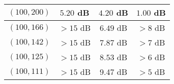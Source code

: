 \begin{table}[t]
\begin{tabular}{c|cc|c|}
    \multicolumn{1}{|c|}{$(100,200)$}  & \multicolumn{1}{c|}{$5.20$ dB}                                                   & $4.20$ dB                                                     & $1.00$ dB                                                                                                          \\ \hline
    \multicolumn{1}{|c|}{$(100,166)$}  & \multicolumn{1}{c|}{$>15$ dB}                                                         & $6.49$ dB                                                     & $>8$ dB                                                                                                                \\ \hline
    \multicolumn{1}{|c|}{$(100,142)$}  & \multicolumn{1}{c|}{$>15$ dB}                                                         & $7.87$ dB                                                     & $>7$ dB                                                                                                                \\ \hline
    \multicolumn{1}{|c|}{$(100,125)$}  & \multicolumn{1}{c|}{$>15$ dB}                                                         & $8.53$ dB                                                     & $>6$ dB                                                                                                                 \\ \hline
    \multicolumn{1}{|c|}{$(100,111)$}  & \multicolumn{1}{c|}{$>15$ dB}                                                         & 9.47 dB                                                     & $>5$ dB                                                                                                                \\ \hline
    \end{tabular}
    \end{table} 
